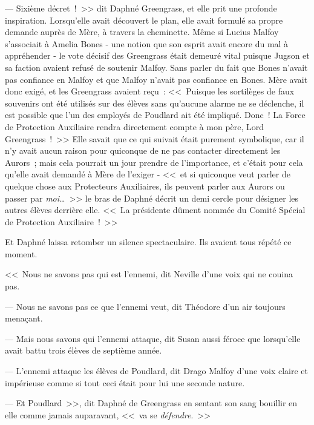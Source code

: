 --- Sixième décret~!~>> dit Daphné Greengrass, et elle prit une profonde inspiration. Lorsqu'elle avait découvert le plan, elle avait formulé sa propre demande auprès de Mère, à travers la cheminette. Même si Lucius Malfoy s'associait à Amelia Bones - une notion que son esprit avait encore du mal à appréhender - le vote décisif des Greengrass était demeuré vital puisque Jugson et sa faction avaient refusé de soutenir Malfoy. Sans parler du fait que Bones n'avait pas confiance en Malfoy et que Malfoy n'avait pas confiance en Bones. Mère avait donc exigé, et les Greengrass avaient reçu~: <<~Puisque les sortilèges de faux souvenirs ont été utilisés sur des élèves sans qu'aucune alarme ne se déclenche, il est possible que l'un des employés de Poudlard ait été impliqué. Donc~! La Force de Protection Auxiliaire rendra directement compte à mon père, Lord Greengrass~!~>> Elle savait que ce qui suivait était purement symbolique, car il n'y avait aucun raison pour quiconque de ne pas contacter directement les Aurors~; mais cela pourrait un jour prendre de l'importance, et c'était pour cela qu'elle avait demandé à Mère de l'exiger - <<~et si quiconque veut parler de quelque chose aux Protecteurs Auxiliaires, ils peuvent parler aux Aurors ou passer par \emph{moi}…~>> le bras de Daphné décrit un demi cercle pour désigner les autres élèves derrière elle. <<~La présidente dûment nommée du Comité Spécial de Protection Auxiliaire~!~>>

Et Daphné laissa retomber un silence spectaculaire. Ils avaient tous répété ce moment.

<<~Nous ne savons pas qui est l'ennemi, dit Neville d'une voix qui ne couina pas.

--- Nous ne savons pas ce que l'ennemi veut, dit Théodore d'un air toujours menaçant.

--- Mais nous savons qui l'ennemi attaque, dit Susan aussi féroce que lorsqu'elle avait battu trois élèves de septième année.

--- L'ennemi attaque les élèves de Poudlard, dit Drago Malfoy d'une voix claire et impérieuse comme si tout ceci était pour lui une seconde nature.

--- Et Poudlard~>>, dit Daphné de Greengrass en sentant son sang bouillir en elle comme jamais auparavant, <<~va se \emph{défendre}.~>>
